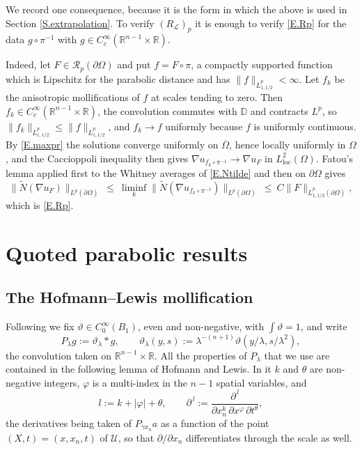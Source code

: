 \documentclass[12pt,leqno]{amsart}
\numberwithin{equation}{section}
\DeclareMathOperator{\loc}{loc}
\newcommand{\R}{\mathbb R}
\newcommand{\abs}[1]{\left\vert#1\right\vert}
\newcommand{\br}[1]{\left(#1\right)}
\newcommand{\om}{\Omega}
\newcommand{\pom}{\partial\Omega}
\newcommand{\pd}{\partial}
\newcommand{\Dpar}{\mathbb D}
\newcommand{\LL}{\mathcal L}
\newcommand{\Uc}{\mathcal U}
\newcommand{\Nt}{\widetilde N}
\theoremstyle{plain}
\theoremstyle{remark}
\begin{document}
\noindent We record one consequence, because it is the form in which the
above is used in Section \ref{S.extrapolation}. To verify $(R_\LL)_p$ it is
enough to verify \eqref{E.Rp} for the data $g\circ\pi^{-1}$ with
$g\in C^\infty_c(\R^{n-1}\times\R)$.

\noindent Indeed, let $F\in\mathcal R_p(\pom)$ and put $f=F\circ\pi$, a
compactly supported function which is Lipschitz for the parabolic distance and
has $\|f\|_{\dot L^p_{1,1/2}}<\infty$. Let $f_k$ be the anisotropic
mollifications of $f$ at scales tending to zero. Then $f_k\in
C^\infty_c(\R^{n-1}\times\R)$, the convolution commutes with $\Dpar$ and
contracts $L^p$, so $\|f_k\|_{\dot L^p_{1,1/2}}\le\|f\|_{\dot
L^p_{1,1/2}}$, and $f_k\to f$ uniformly because $f$ is uniformly continuous.
By \eqref{E.maxpr} the solutions converge uniformly on $\overline\om$, hence
locally uniformly in $\om$, and the Caccioppoli inequality then gives
$\nabla u_{f_k\circ\pi^{-1}}\to\nabla u_F$ in $L^2_{\loc}(\om)$. Fatou's
lemma applied first to the Whitney averages of \eqref{E.Ntilde} and then on
$\pom$ gives
$$\big\|\Nt(\nabla u_F)\big\|_{L^p(\pom)}\ \le\
  \liminf_k\big\|\Nt(\nabla u_{f_k\circ\pi^{-1}})\big\|_{L^p(\pom)}
  \ \le\ C\|F\|_{\dot L^p_{1,1/2}(\pom)} ,$$
which is \eqref{E.Rp}.

\section{Quoted parabolic results}\label{S.quoted}

\subsection{The Hofmann--Lewis mollification}\label{ss.moll}

Following \cite[(1.6)]{HLmem} we fix $\vartheta\in C^\infty_0(B_1)$, even and
non-negative, with $\int\vartheta=1$, and write
$$P_\lambda g:=\vartheta_\lambda*g,\qquad
  \vartheta_\lambda(y,s):=\lambda^{-(n+1)}\vartheta\br{y/\lambda,s/\lambda^2},$$
the convolution taken on $\R^{n-1}\times\R$. All the properties of $P_\lambda$
that we use are contained in the following lemma of Hofmann and Lewis. In it
$k$ and $\theta$ are non-negative integers, $\varphi$ is a multi-index in
the $n-1$ spatial variables, and
$$l:=k+\abs\varphi+\theta,\qquad
  \pd^{\,l}:=\frac{\pd^{\,l}}{\pd x_n^k\,\pd x^\varphi\,\pd t^\theta} ,$$
the derivatives being taken of $P_{\gamma x_n}a$ as a function of the point
$(X,t)=(x,x_n,t)$ of $\Uc$, so that $\pd/\pd x_n$ differentiates through the
scale as well.
\end{document}
